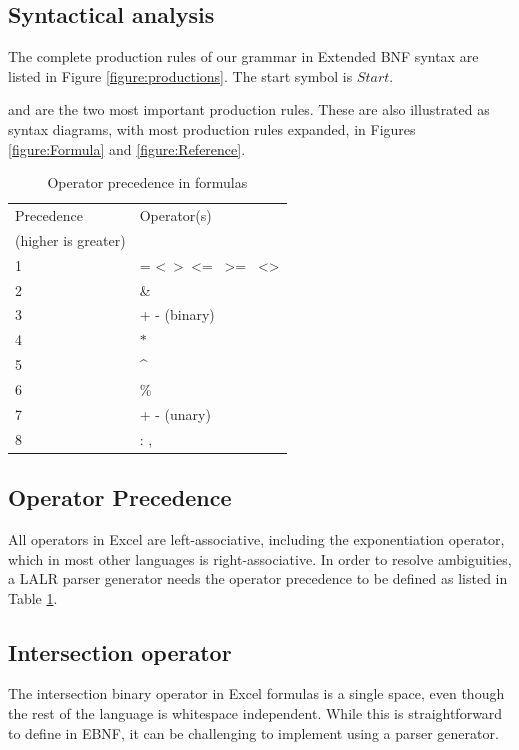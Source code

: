 \documentclass[conference]{IEEEtran}
\begin{document}
\subsection{Syntactical analysis}
\label{subsection:productionRules}

The complete production rules of our grammar in Extended BNF syntax are listed in Figure \ref{figure:productions}.
The start symbol is $Start$.

 and  are the two most important production rules.
These are also illustrated as syntax diagrams, with most production rules expanded, in Figures \ref{figure:Formula} and \ref{figure:Reference}.
\begin{table}
	\centering
\caption{Operator precedence in formulas}
\label{table:operatorprec}
\begin{tabular}{ll}
\toprule
Precedence & Operator(s) \\
(higher is greater) & \\
\midrule
1 & = \textless \  \textgreater \  \textless= \  \textgreater= \  \textless\textgreater          \\
2 & \&  \\
3 & + - (binary) \\
4 & $\ast$ \\
5 & \textasciicircum \\
6 & \% \\
7 & + - (unary) \\
8 & : , \texttt{\char32} \\
\bottomrule
\end{tabular}
\end{table}

\subsection{Operator Precedence}
\label{sec:operatorprecedence}

All operators in Excel are left-associative, including the exponentiation operator, which in most other languages is right-associative.
In order to resolve ambiguities, a LALR parser generator needs the operator precedence to be defined as listed in Table \ref{table:operatorprec}.

\subsection{Intersection operator}

The intersection binary operator in Excel formulas is a single space, even though the rest of the language is whitespace independent. While this is straightforward to define in EBNF, it can be challenging to implement using a parser generator.
\end{document}
